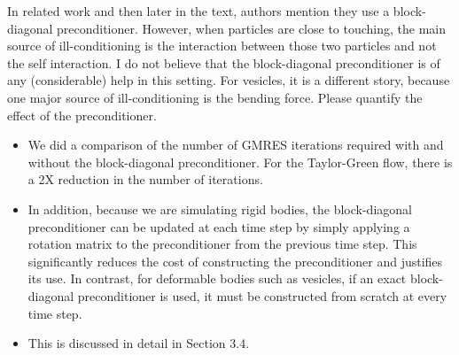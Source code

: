 \documentclass[11pt]{article}
\newcommand{\comment}[1]{{\color{blue} #1}}
\begin{document}
\noindent
\comment{In related work and then later in the text, authors mention
  they use a block-diagonal preconditioner. However, when particles are
  close to touching, the main source of ill-conditioning is the
  interaction between those two particles and not the self interaction.
  I do not believe that the block-diagonal preconditioner is of any
  (considerable) help in this setting.  For vesicles, it is a different
  story, because one major source of ill-conditioning is the bending
force.  Please quantify the effect of the preconditioner.}
\begin{itemize}
  \item We did a comparison of the number of GMRES iterations required
    with and without the block-diagonal preconditioner.  For the
    Taylor-Green flow, there is a 2X reduction in the number of
    iterations.

  \item In addition, because we are simulating rigid bodies, the
    block-diagonal preconditioner can be updated at each time step by
    simply applying a rotation matrix to the preconditioner from the
    previous time step.  This significantly reduces the cost of
    constructing the preconditioner and justifies its use.  In contrast,
    for deformable bodies such as vesicles, if an exact block-diagonal
    preconditioner is used, it must be constructed from scratch at every
    time step.

  \item This is discussed in detail in Section 3.4.
\end{itemize}
\end{document}

